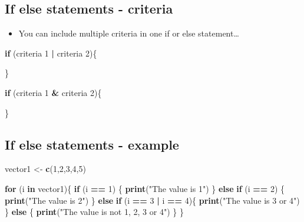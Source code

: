\documentclass[]{article}
\newenvironment{Shaded}{\begin{snugshade}}{\end{snugshade}}
\newcommand{\KeywordTok}[1]{\textcolor[rgb]{0.13,0.29,0.53}{\textbf{#1}}}
\newcommand{\DecValTok}[1]{\textcolor[rgb]{0.00,0.00,0.81}{#1}}
\newcommand{\StringTok}[1]{\textcolor[rgb]{0.31,0.60,0.02}{#1}}
\newcommand{\ControlFlowTok}[1]{\textcolor[rgb]{0.13,0.29,0.53}{\textbf{#1}}}
\newcommand{\OperatorTok}[1]{\textcolor[rgb]{0.81,0.36,0.00}{\textbf{#1}}}
\newcommand{\NormalTok}[1]{#1}
\providecommand{\tightlist}{%
  \setlength{\itemsep}{0pt}\setlength{\parskip}{0pt}}
\begin{document}
\subsection{If else statements -
criteria}\label{if-else-statements---criteria}

\begin{itemize}
\tightlist
\item
  You can include multiple criteria in one if or else statement\ldots{}
\end{itemize}

\begin{Shaded}
\begin{Highlighting}[]
\ControlFlowTok{if}\NormalTok{ (criteria }\DecValTok{1} \OperatorTok{|}\StringTok{ }\NormalTok{criteria }\DecValTok{2}\NormalTok{)\{}
  
\NormalTok{\}}

\ControlFlowTok{if}\NormalTok{ (criteria }\DecValTok{1} \OperatorTok{&}\StringTok{ }\NormalTok{criteria }\DecValTok{2}\NormalTok{)\{}
  
\NormalTok{\}}
\end{Highlighting}
\end{Shaded}

\subsection{If else statements -
example}\label{if-else-statements---example}

\begin{Shaded}
\begin{Highlighting}[]
\NormalTok{vector1 <-}\StringTok{ }\KeywordTok{c}\NormalTok{(}\DecValTok{1}\NormalTok{,}\DecValTok{2}\NormalTok{,}\DecValTok{3}\NormalTok{,}\DecValTok{4}\NormalTok{,}\DecValTok{5}\NormalTok{)}

\ControlFlowTok{for}\NormalTok{ (i }\ControlFlowTok{in}\NormalTok{ vector1)\{}
  \ControlFlowTok{if}\NormalTok{ (i }\OperatorTok{==}\StringTok{ }\DecValTok{1}\NormalTok{) \{}
    \KeywordTok{print}\NormalTok{(}\StringTok{"The value is 1"}\NormalTok{)}
\NormalTok{  \} }\ControlFlowTok{else} \ControlFlowTok{if}\NormalTok{ (i }\OperatorTok{==}\StringTok{ }\DecValTok{2}\NormalTok{) \{}
    \KeywordTok{print}\NormalTok{(}\StringTok{"The value is 2"}\NormalTok{)}
\NormalTok{  \} }\ControlFlowTok{else} \ControlFlowTok{if}\NormalTok{ (i }\OperatorTok{==}\StringTok{ }\DecValTok{3} \OperatorTok{|}\StringTok{ }\NormalTok{i }\OperatorTok{==}\StringTok{ }\DecValTok{4}\NormalTok{)\{}
    \KeywordTok{print}\NormalTok{(}\StringTok{"The value is 3 or 4"}\NormalTok{)}
\NormalTok{  \} }\ControlFlowTok{else}\NormalTok{ \{}
    \KeywordTok{print}\NormalTok{(}\StringTok{"The value is not 1, 2, 3 or 4"}\NormalTok{)}
\NormalTok{  \}}
\NormalTok{\}}
\end{Highlighting}
\end{Shaded}
\end{document}

